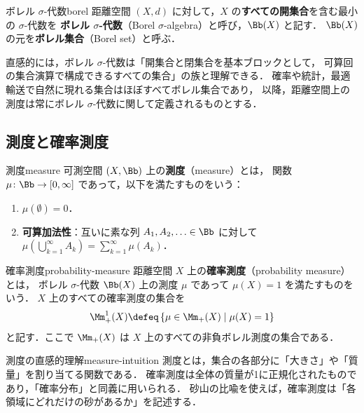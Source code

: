 \begin{definition}{ボレル $\sigma$-代数}{borel}
  距離空間 $(X, d)$ に対して，$X$ の\textbf{すべての開集合}を含む最小の $\sigma$-代数を
  \textbf{ボレル $\sigma$-代数}（Borel $\sigma$-algebra）と呼び，$\Bb(X)$ と記す．
  $\Bb(X)$ の元を\textbf{ボレル集合}（Borel set）と呼ぶ．
\end{definition}

直感的には，ボレル $\sigma$-代数は「開集合と閉集合を基本ブロックとして，
可算回の集合演算で構成できるすべての集合」の族と理解できる．
確率や統計，最適輸送で自然に現れる集合はほぼすべてボレル集合であり，
以降，距離空間上の測度は常にボレル $\sigma$-代数に関して定義されるものとする．

\subsection{測度と確率測度}
\label{subsec:measures}

\begin{definition}{測度}{measure}
  可測空間 $(X, \Bb)$ 上の\textbf{測度}（measure）とは，
  関数 $\mu \colon \Bb \to [0, \infty]$ であって，以下を満たすものをいう：
  \begin{enumerate}
    \item $\mu(\emptyset) = 0$．
    \item \textbf{可算加法性}：互いに素な列 $A_1, A_2, \ldots \in \Bb$
      に対して $\mu\!\left(\bigcup_{k=1}^{\infty} A_k\right) = \sum_{k=1}^{\infty} \mu(A_k)$．
  \end{enumerate}
\end{definition}

\begin{definition}{確率測度}{probability-measure}
  距離空間 $X$ 上の\textbf{確率測度}（probability measure）とは，
  ボレル $\sigma$-代数 $\Bb(X)$ 上の測度 $\mu$ であって $\mu(X) = 1$ を満たすものをいう．
  $X$ 上のすべての確率測度の集合を
  \[
    \Mm_+^1(X) \defeq \left\{ \mu \in \Mm_+(X) \;\middle|\; \mu(X) = 1 \right\}
  \]
  と記す．ここで $\Mm_+(X)$ は $X$ 上のすべての非負ボレル測度の集合である．
\end{definition}

\begin{remark}{測度の直感的理解}{measure-intuition}
  測度とは，集合の各部分に「大きさ」や「質量」を割り当てる関数である．
  確率測度は全体の質量が1に正規化されたものであり，「確率分布」と同義に用いられる．
  砂山の比喩を使えば，確率測度は「各領域にどれだけの砂があるか」を記述する．
\end{remark}

